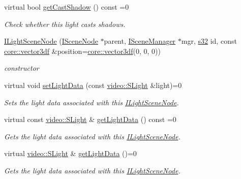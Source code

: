 \begin{DoxyCompactItemize}
virtual bool \hyperlink{classirr_1_1scene_1_1ILightSceneNode_a5ba3a03fc0cfbad7dd8ce2f338a1991a}{get\+Cast\+Shadow} () const =0
\begin{DoxyCompactList}\small\item\em Check whether this light casts shadows. \end{DoxyCompactList}\item 
\mbox{\label{classirr_1_1scene_1_1ILightSceneNode_aa13c236d797d731c1035820a909ba961}} 
\hyperlink{classirr_1_1scene_1_1ILightSceneNode_aa13c236d797d731c1035820a909ba961}{I\+Light\+Scene\+Node} (\hyperlink{classirr_1_1scene_1_1ISceneNode}{I\+Scene\+Node} $\ast$parent, \hyperlink{classirr_1_1scene_1_1ISceneManager}{I\+Scene\+Manager} $\ast$mgr, \hyperlink{namespaceirr_ac66849b7a6ed16e30ebede579f9b47c6}{s32} id, const \hyperlink{namespaceirr_1_1core_ae6e2b2a6c552833ebbd5b7463d03586b}{core\+::vector3df} \&position=\hyperlink{namespaceirr_1_1core_ae6e2b2a6c552833ebbd5b7463d03586b}{core\+::vector3df}(0, 0, 0))
\begin{DoxyCompactList}\small\item\em constructor \end{DoxyCompactList}\item 
virtual void \hyperlink{classirr_1_1scene_1_1ILightSceneNode_acf74ff3400a26ae31eb96b9c479e62d5}{set\+Light\+Data} (const \hyperlink{structirr_1_1video_1_1SLight}{video\+::\+S\+Light} \&light)=0
\begin{DoxyCompactList}\small\item\em Sets the light data associated with this \hyperlink{classirr_1_1scene_1_1ILightSceneNode}{I\+Light\+Scene\+Node}. \end{DoxyCompactList}\item 
virtual const \hyperlink{structirr_1_1video_1_1SLight}{video\+::\+S\+Light} \& \hyperlink{classirr_1_1scene_1_1ILightSceneNode_a687813feae9312a86882e12c2bd10194}{get\+Light\+Data} () const =0
\begin{DoxyCompactList}\small\item\em Gets the light data associated with this \hyperlink{classirr_1_1scene_1_1ILightSceneNode}{I\+Light\+Scene\+Node}. \end{DoxyCompactList}\item 
virtual \hyperlink{structirr_1_1video_1_1SLight}{video\+::\+S\+Light} \& \hyperlink{classirr_1_1scene_1_1ILightSceneNode_a20147e049be1a4790346fd72b150b30c}{get\+Light\+Data} ()=0
\begin{DoxyCompactList}\small\item\em Gets the light data associated with this \hyperlink{classirr_1_1scene_1_1ILightSceneNode}{I\+Light\+Scene\+Node}. \end{DoxyCompactList}\item 

\end{DoxyCompactItemize}
